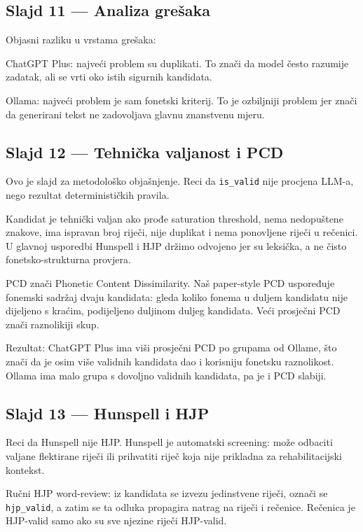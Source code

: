 \documentclass[
]{article}
\begin{document}
\subsection{Slajd 11 --- Analiza
grešaka}\label{slajd-11-analiza-greux161aka}

Objasni razliku u vrstama grešaka:

ChatGPT Plus: najveći problem su duplikati. To znači da model često
razumije zadatak, ali se vrti oko istih sigurnih kandidata.

Ollama: najveći problem je sam fonetski kriterij. To je ozbiljniji
problem jer znači da generirani tekst ne zadovoljava glavnu znanstvenu
mjeru.

\subsection{Slajd 12 --- Tehnička valjanost i
PCD}\label{slajd-12-tehniux10dka-valjanost-i-pcd}

Ovo je slajd za metodološko objašnjenje. Reci da \texttt{is\_valid} nije
procjena LLM-a, nego rezultat determinističkih pravila.

Kandidat je tehnički valjan ako prođe saturation threshold, nema
nedopuštene znakove, ima ispravan broj riječi, nije duplikat i nema
ponovljene riječi u rečenici. U glavnoj usporedbi Hunspell i HJP držimo
odvojeno jer su leksička, a ne čisto fonetsko-strukturna provjera.

PCD znači Phonetic Content Dissimilarity. Naš paper-style PCD uspoređuje
fonemski sadržaj dvaju kandidata: gleda koliko fonema u duljem kandidatu
nije dijeljeno s kraćim, podijeljeno duljinom duljeg kandidata. Veći
prosječni PCD znači raznolikiji skup.

Rezultat: ChatGPT Plus ima viši prosječni PCD po grupama od Ollame, što
znači da je osim više validnih kandidata dao i korisniju fonetsku
raznolikost. Ollama ima malo grupa s dovoljno validnih kandidata, pa je
i PCD slabiji.

\subsection{Slajd 13 --- Hunspell i HJP}\label{slajd-13-hunspell-i-hjp}

Reci da Hunspell nije HJP. Hunspell je automatski screening: može
odbaciti valjane flektirane riječi ili prihvatiti riječ koja nije
prikladna za rehabilitacijski kontekst.

Ručni HJP word-review: iz kandidata se izvezu jedinstvene riječi, označi
se \texttt{hjp\_valid}, a zatim se ta odluka propagira natrag na riječi
i rečenice. Rečenica je HJP-valid samo ako su sve njezine riječi
HJP-valid.
\end{document}

